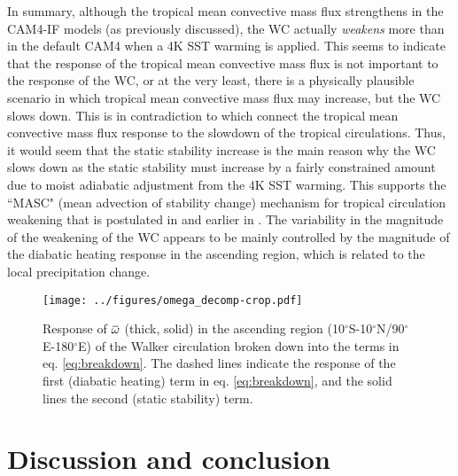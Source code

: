 \documentclass[letterpaper,12pt,titlepage,oneside,final]{book}
\newcommand{\overbar}[1]{\mkern 1.5mu\overline{\mkern-1.5mu#1\mkern-1.5mu}\mkern 1.5mu}
\begin{document}
In summary, although the tropical mean convective mass flux strengthens in the CAM4-IF models (as previously discussed), the WC actually \textit{weakens} more than in the default CAM4 when a 4K SST warming is applied. This seems to indicate that the response of the tropical mean convective mass flux is not important to the response of the WC, or at the very least, there is a physically plausible scenario in which tropical mean convective mass flux may increase, but the WC slows down. This is in contradiction to \citep{held_robust_2006,vecchi_global_2007} which connect the tropical mean convective mass flux response to the slowdown of the tropical circulations. Thus, it would seem that the static stability increase is the main reason why the WC slows down as the static stability must increase by a fairly constrained amount due to moist adiabatic adjustment from the 4K SST warming. This supports the ``MASC" (mean advection of stability change) mechanism for tropical circulation weakening that is postulated in \citep{ma_mechanisms_2011} and earlier in \citep{knutson_time-mean_1995}. The variability in the magnitude of the weakening of the WC appears to be mainly controlled by the magnitude of the diabatic heating response in the ascending region, which is related to the local precipitation change. 

\begin{figure}[H]
\centering
\noindent\texttt{[image: ../figures/omega\_decomp-crop.pdf]}\hfill
\caption{\footnotesize \footnotesize Response of $\overbar{\omega}$ (thick, solid) in the ascending region (10$^{\circ}$S-10$^{\circ}$N/90$^{\circ}$E-180$^{\circ}$E) of the Walker circulation broken down into the terms in eq. \ref{eq:breakdown}. The dashed lines indicate the response of the first (diabatic heating) term in eq. \ref{eq:breakdown}, and the solid lines the second (static stability) term. }
\label{fig:omegdecomp}
\end{figure}


\chapter{Discussion and conclusion}
\end{document}
